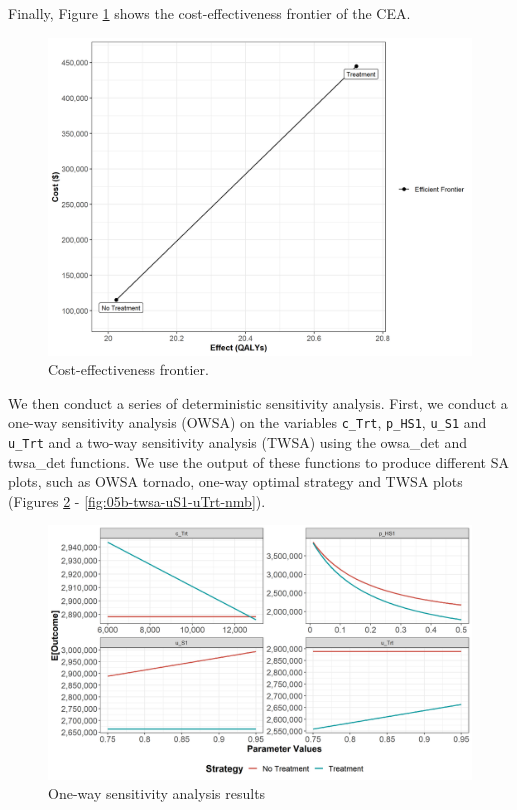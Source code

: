 \documentclass[]{book}
\begin{document}
Finally, Figure \ref{fig:05b-CEA-frontier} shows the cost-effectiveness frontier of the CEA.

\begin{figure}

{\centering \includegraphics[width=1\linewidth]{../figs/05b_cea_frontier} 

}

\caption{Cost-effectiveness frontier.}\label{fig:05b-CEA-frontier}
\end{figure}

We then conduct a series of deterministic sensitivity analysis. First, we conduct a one-way sensitivity analysis (OWSA) on the variables \texttt{c\_Trt}, \texttt{p\_HS1}, \texttt{u\_S1} and \texttt{u\_Trt} and a two-way sensitivity analysis (TWSA) using the owsa\_det and twsa\_det functions. We use the output of these functions to produce different SA plots, such as OWSA tornado, one-way optimal strategy and TWSA plots (Figures \ref{fig:05b-owsa-nmb} - \ref{fig:05b-twsa-uS1-uTrt-nmb}).

\begin{figure}

{\centering \includegraphics[width=1\linewidth]{../figs/05b_owsa_nmb} 

}

\caption{One-way sensitivity analysis results}\label{fig:05b-owsa-nmb}
\end{figure}
\end{document}
